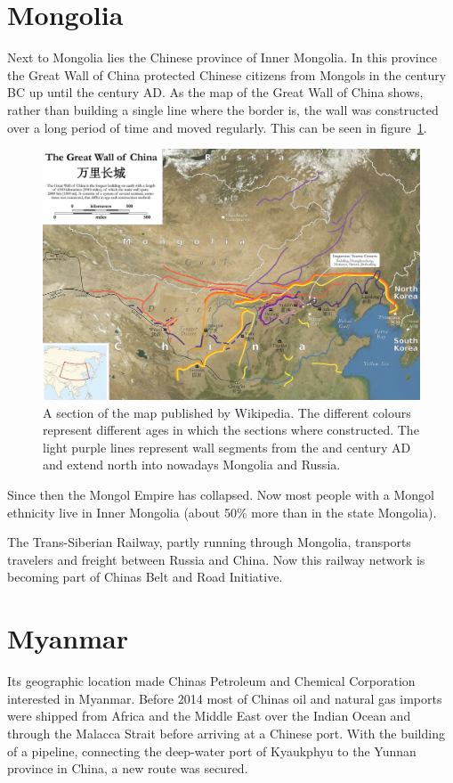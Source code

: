 \documentclass[conference]{IEEEtran}
\begin{document}
	\section{Mongolia}
	Next to Mongolia lies the Chinese province of Inner Mongolia. In this province the Great Wall of China protected Chinese citizens from Mongols in the  century BC up until the  century AD\cite{worldAtlas_whyWasTheGreatWallOfChinaBuilt}. As the map of the Great Wall of China shows, rather than building a single line where the border is, the wall was constructed over a long period of time and moved regularly. This can be seen in figure~\ref{pic:mongolia_greatWallOfChina}.
	
	\begin{figure}[t]
		\centering
		\includegraphics[width=\linewidth]{img/mongolia_greatWallOfChina.png}
		\caption{A section of the map published by Wikipedia\cite{wp_greatWallOfChina}. The different colours represent different ages in which the sections where constructed. The light purple lines represent wall segments from the  and  century AD and extend north into nowadays Mongolia and Russia.}
		\label{pic:mongolia_greatWallOfChina}
	\end{figure}

	Since then the Mongol Empire has collapsed. Now most people with a Mongol ethnicity live in Inner Mongolia (about 50\% more than in the state Mongolia).
	
	The Trans-Siberian Railway, partly running through Mongolia, transports travelers and freight between Russia and China. Now this railway network is becoming part of Chinas Belt and Road Initiative.
	
	\section{Myanmar}
	Its geographic location made Chinas Petroleum and Chemical Corporation interested in Myanmar. Before 2014 most of Chinas oil and natural gas imports were shipped from Africa and the Middle East over the Indian Ocean and through the Malacca Strait before arriving at a Chinese port. With the building of a pipeline, connecting the deep-water port of Kyaukphyu to the Yunnan province in China, a new route was secured\cite{chinaDaily_oilStartsFlowingThroughChinaMyanmarPipeline}.
	
\end{document}
